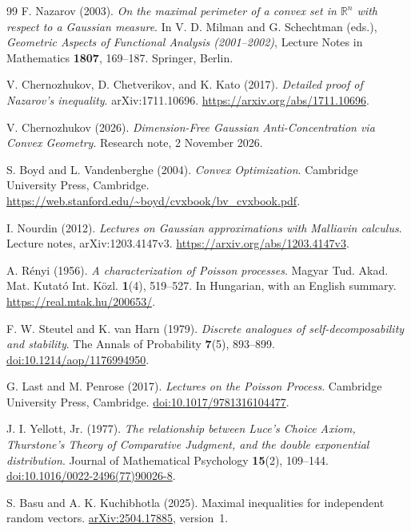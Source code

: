 \documentclass[11pt,letterpaper]{article}
\theoremstyle{remark}
\newcommand{\R}{\mathbb R}
\begin{document}
\begin{thebibliography}{99}
F. Nazarov (2003).
\emph{On the maximal perimeter of a convex set in \(\R^n\)
with respect to a Gaussian measure}.
In V. D. Milman and G. Schechtman (eds.),
\emph{Geometric Aspects of Functional Analysis (2001--2002)},
Lecture Notes in Mathematics \textbf{1807}, 169--187.
Springer, Berlin.

V. Chernozhukov, D. Chetverikov, and K. Kato (2017).
\emph{Detailed proof of Nazarov's inequality}.
arXiv:1711.10696.
\url{https://arxiv.org/abs/1711.10696}.

V. Chernozhukov (2026).
\emph{Dimension-Free Gaussian Anti-Concentration via Convex Geometry}.
Research note, 2 November 2026.

S. Boyd and L. Vandenberghe (2004).
\emph{Convex Optimization}.
Cambridge University Press, Cambridge.
\url{https://web.stanford.edu/~boyd/cvxbook/bv_cvxbook.pdf}.

I. Nourdin (2012).
\emph{Lectures on Gaussian approximations with Malliavin calculus}.
Lecture notes, arXiv:1203.4147v3.
\url{https://arxiv.org/abs/1203.4147v3}.

A. R\'enyi (1956).
\emph{A characterization of Poisson processes}.
Magyar Tud. Akad. Mat. Kutat\'o Int. K\"ozl. \textbf{1}(4), 519--527.
In Hungarian, with an English summary.
\url{https://real.mtak.hu/200653/}.

F. W. Steutel and K. van Harn (1979).
\emph{Discrete analogues of self-decomposability and stability}.
The Annals of Probability \textbf{7}(5), 893--899.
\href{https://doi.org/10.1214/aop/1176994950}{doi:10.1214/aop/1176994950}.

G. Last and M. Penrose (2017).
\emph{Lectures on the Poisson Process}.
Cambridge University Press, Cambridge.
\href{https://doi.org/10.1017/9781316104477}{doi:10.1017/9781316104477}.

J. I. Yellott, Jr. (1977).
\emph{The relationship between Luce's Choice Axiom, Thurstone's Theory
of Comparative Judgment, and the double exponential distribution}.
Journal of Mathematical Psychology \textbf{15}(2), 109--144.
\href{https://doi.org/10.1016/0022-2496(77)90026-8}{doi:10.1016/0022-2496(77)90026-8}.

S. Basu and A. K. Kuchibhotla (2025).
Maximal inequalities for independent random vectors.
\href{https://arxiv.org/abs/2504.17885}{arXiv:2504.17885}, version~1.

\end{thebibliography}
\end{document}
